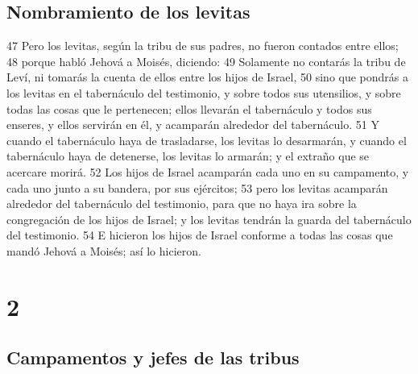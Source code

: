 \section*{Nombramiento de los levitas}

47 Pero los levitas, según la tribu de sus padres, no fueron contados entre ellos;
48 porque habló Jehová a Moisés, diciendo:
49 Solamente no contarás la tribu de Leví, ni tomarás la cuenta de ellos entre los hijos de Israel,
50 sino que pondrás a los levitas en el tabernáculo del testimonio, y sobre todos sus utensilios, y sobre todas las cosas que le pertenecen; ellos llevarán el tabernáculo y todos sus enseres, y ellos servirán en él, y acamparán alrededor del tabernáculo.
51 Y cuando el tabernáculo haya de trasladarse, los levitas lo desarmarán, y cuando el tabernáculo haya de detenerse, los levitas lo armarán; y el extraño que se acercare morirá.
52 Los hijos de Israel acamparán cada uno en su campamento, y cada uno junto a su bandera, por sus ejércitos;
53 pero los levitas acamparán alrededor del tabernáculo del testimonio, para que no haya ira sobre la congregación de los hijos de Israel; y los levitas tendrán la guarda del tabernáculo del testimonio.
54 E hicieron los hijos de Israel conforme a todas las cosas que mandó Jehová a Moisés; así lo hicieron.

\chapter{2}

\section*{Campamentos y jefes de las tribus}



